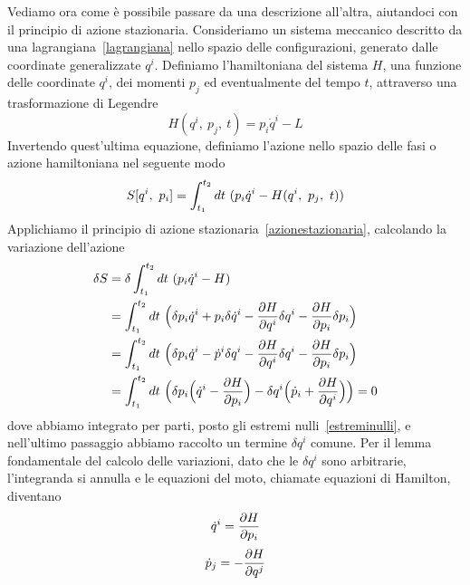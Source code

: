     Vediamo ora come è possibile passare da una descrizione all'altra, aiutandoci con il principio di azione stazionaria. Consideriamo un sistema meccanico descritto da una lagrangiana~\eqref{lagrangiana} nello spazio delle configurazioni, generato dalle coordinate generalizzate $q^i$. Definiamo l'hamiltoniana del sistema $H$, una funzione delle coordinate $q^i$, dei momenti $p_j$ ed eventualmente del tempo $t$, attraverso una trasformazione di Legendre 
    \begin{equation} \label{hamiltoniana}
        H(q^i, ~p_j, ~t) = p_i \dot q^i - L
    \end{equation} 
    Invertendo quest'ultima equazione, definiamo l'azione nello spazio delle fasi o azione hamiltoniana nel seguente modo 
    \begin{equation*}
        S[q^i, ~p_i] = \int_{t_1}^{t_2}dt~ (p_i \dot q^i - H(q^i, ~p_j, ~t))
    \end{equation*}
    Applichiamo il principio di azione stazionaria~\eqref{azionestazionaria}, calcolando la variazione dell'azione
    \begin{equation*}
    \begin{aligned}
        \delta S & = \delta \int_{t_1}^{t_2}dt~ (p_i \dot q^i - H) \\ & = \int_{t_1}^{t_2}dt~ \Big ( \delta p_i \dot q^i + p_i \delta \dot q^i - \frac{\partial H}{\partial q^i} \delta q^i - \frac{\partial H}{\partial p_i} \delta p_i \Big ) \\ & = \int_{t_1}^{t_2}dt~ \Big ( \delta p_i \dot q^i - \dot p^i \delta q^i - \frac{\partial H}{\partial q^i} \delta q^i - \frac{\partial H}{\partial p_i} \delta p_i \Big) \\ & = \int_{t_1}^{t_2}dt~ \Big ( \delta p_i \Big( \dot q^i - \frac{\partial H}{\partial p_i} \Big ) - \delta q^i \Big(\dot p_i + \frac{\partial H}{\partial q^i} \Big ) \Big) = 0
    \end{aligned}
    \end{equation*}
    dove abbiamo integrato per parti, posto gli estremi nulli~\eqref{estreminulli}, e nell'ultimo passaggio abbiamo raccolto un termine $\delta q^i$ comune. Per il lemma fondamentale del calcolo delle variazioni, dato che le $\delta q^i$ sono arbitrarie, l'integranda si annulla e le equazioni del moto, chiamate equazioni di Hamilton, diventano 
    \begin{equation} \label{ham1}
        \dot q^i = \frac{\partial H}{\partial p_i}
    \end{equation}
    \begin{equation} \label{ham2}
        \dot p_j = - \frac{\partial H}{\partial q^j}
    \end{equation}
    
